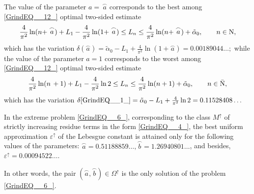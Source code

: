 \documentclass[
11pt,%
tightenlines,%
twoside,%
onecolumn,%
nofloats,%
nobibnotes,%
nofootinbib,%
superscriptaddress,%
noshowpacs,%
centertags]%
{revtex4}
\begin{document}
\begin{lemma} The value of the parameter $a=\, \stackrel{\frown}{a}$ corresponds to the best among \eqref{GrindEQ__12_} optimal two-sided estimate
\begin{equation} \label{GrindEQ__14_} \frac{4}{\pi ^{2} } \ln (n+ \stackrel{\frown}{a}) + L_{1}  - \frac{4}{\pi ^{2} } \ln (1+ \stackrel{\frown}{a} ) \le L_{n}  \le  \frac{4}{\pi ^{2} } \ln (n+ \stackrel{\frown}{a} ) + \tilde{\alpha }_{0},\qquad n\in {\rm N}, 
\end{equation}
which has the variation $\delta (\stackrel{\frown}{a}) = \tilde{\alpha }_{0}  - L_{1}  +\frac{4}{\pi ^{2} }  \ln (1 + \stackrel{\frown}{a}) = 0.00189044\dots;$
while the value of the parameter $a=1$ corresponds to the worst
	among \eqref{GrindEQ__12_} optimal two-sided estimate
\begin{equation} \label{GrindEQ__15_} \frac{4}{\pi ^{2} } \ln (n\, +1) + L_{1} -\frac{4}{\pi ^{2} } \ln 2 \le L_{n}  \le  \frac{4}{\pi ^{2} } \ln (n + 1) + \tilde{\alpha }_{0},\qquad n\in  \bar{{\rm N} },  \end{equation}
which has the variation $ \delta \eqref{GrindEQ__1_}  =  \tilde{\alpha }_{0} -  L_{1}  +  \frac{4}{\pi ^{2} } \ln 2  =  0.11528408\dots$

\end{lemma}

\begin{lemma} In the extreme problem \eqref{GrindEQ__6_}, corresponding to the class $M^{\uparrow } $ of strictly increasing residue terms in the form \eqref{GrindEQ__4_}, the best uniform approximation $\varepsilon ^{\uparrow }$ of the Lebesgue constant is attained only for the following values of the parameters:
	$\stackrel{\frown}{a} = 0.51188859\dots, \stackrel{\frown}{b}= 1.26940801\dots$, and besides, \\
	$\varepsilon ^{\uparrow } =0.00094522\dots$.

In other words, the pair $(\stackrel{\frown}{a}, \stackrel{\frown}{b})\in \Omega ^{\uparrow } $ is the only solution of the problem \eqref{GrindEQ__6_}.
\end{lemma}
\end{document}
